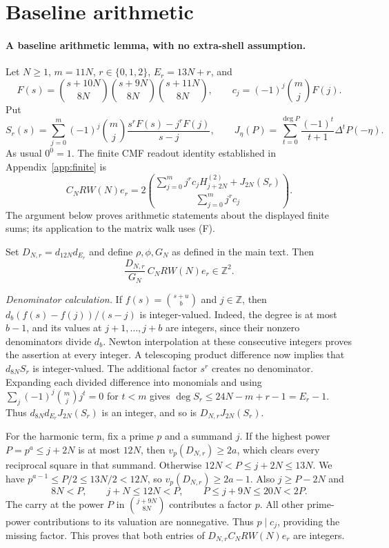 \documentclass[11pt]{article}
\begin{document}
\section{Baseline arithmetic}\label{app:baseline}

\paragraph{A baseline arithmetic lemma, with no extra-shell assumption.}
Let $N\ge1$, $m=11N$, $r\in\{0,1,2\}$, $E_r=13N+r$, and
\[
 F(s)=\binom{s+10N}{8N}\binom{s+9N}{8N}\binom{s+11N}{8N},\qquad
 c_j=(-1)^j\binom{m}{j}F(j).
\]
Put
\[
 S_r(s)=\sum_{j=0}^m(-1)^j\binom mj
              \frac{s^rF(s)-j^rF(j)}{s-j},\qquad
 J_\eta(P)=\sum_{t=0}^{\deg P}\frac{(-1)^t}{t+1}
                 \Delta^t P(-\eta).
\]
As usual $0^0=1$. The finite CMF readout identity established in Appendix~\ref{app:finite} is
\[
 C_NRW(N)e_r=2\binom{\sum_{j=0}^m j^r c_jH_{j+2N}^{(2)}+J_{2N}(S_r)}
                         {\sum_{j=0}^m j^r c_j}.
 \tag{F}
\]
The argument below proves arithmetic statements about the displayed finite
sums; its application to the matrix walk uses (F).

Set $D_{N,r}=d_{12N}d_{E_r}$ and define $\rho,\phi,G_N$ as defined in the main text. Then
\[
 \frac{D_{N,r}}{G_N}\,C_NRW(N)e_r\in\mathbb Z^2.
 \tag{B}
\]

\emph{Denominator calculation.}
If $f(s)=\binom{s+u}{b}$ and $j\in\mathbb Z$, then
$d_b(f(s)-f(j))/(s-j)$ is integer-valued. Indeed, the degree is at most
$b-1$, and its values at $j+1,\ldots,j+b$ are integers, since their
nonzero denominators divide $d_b$. Newton interpolation at these
consecutive integers proves the assertion at every integer.
A telescoping product difference now implies that $d_{8N}S_r$ is
integer-valued. The additional factor $s^r$ creates no denominator.
Expanding each divided difference into monomials and using
$\sum_j(-1)^j\binom mjj^t=0$ for $t<m$ gives
$\deg S_r\le24N-m+r-1=E_r-1$.
Thus $d_{8N}d_{E_r}J_{2N}(S_r)$ is an integer, and so is
$D_{N,r}J_{2N}(S_r)$.

For the harmonic term, fix a prime $p$ and a summand $j$.
If the highest power $P=p^a\le j+2N$ is at most $12N$, then
$v_p(D_{N,r})\ge2a$, which clears every reciprocal square in that
summand. Otherwise $12N<P\le j+2N\le13N$.
We have $p^{a-1}\le P/2\le13N/2<12N$, so
$v_p(D_{N,r})\ge2a-1$.
Also $j\ge P-2N$ and
\[
 8N<P,\qquad j+N\le12N<P,\qquad
 P\le j+9N\le20N<2P.
\]
The carry at the power $P$ in $\binom{j+9N}{8N}$ contributes a factor
$p$. All other prime-power contributions to its valuation are nonnegative.
Thus $p\mid c_j$, providing the missing factor. This proves that both
entries of $D_{N,r}C_NRW(N)e_r$ are integers.
\end{document}
